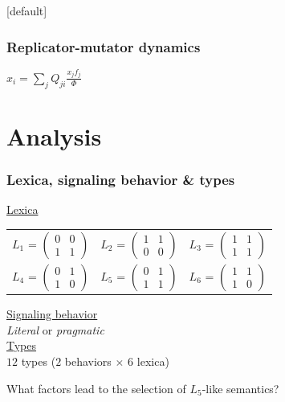 \documentclass{beamer} %
\makeatletter
\newenvironment{withoutheadline}{
        \setbeamertemplate{headline}[default]
        \def\beamer@entrycode{\vspace*{-\headheight}}
    }{}
\makeatother
\begin{document}
\begin{withoutheadline}
\begin{frame}
	\frametitle{Replicator-mutator dynamics}
\begin{center}
$\hat{x}_i = \sum_j Q_{ji} \frac{x_j f_j}{\Phi}$
\end{center}
\end{frame}


\section{Analysis}



\begin{frame}
	\frametitle{Lexica, signaling behavior \& types}
\underline{Lexica}
\begin{table}
\centering 
\begin{tabular}{l c l}
$L_1$ = $\begin{pmatrix} 0 & 0 \\ 1 & 1 \end{pmatrix}$ & 
$L_2$ = $\begin{pmatrix} 1 & 1 \\ 0 & 0 \end{pmatrix}$ & 
$L_3$ = $\begin{pmatrix} 1 & 1 \\ 1 & 1 \end{pmatrix}$\\[1cm]

$L_4$ = $\begin{pmatrix} 0 & 1 \\ 1 & 0 \end{pmatrix}$ &
$L_5$ = $\begin{pmatrix} 0 & 1 \\ 1 & 1 \end{pmatrix}$ &
$L_6$ = $\begin{pmatrix} 1 & 1 \\ 1 & 0 \end{pmatrix}$
\end{tabular}
\end{table}
\underline{Signaling behavior}\\ {\em Literal} or {\em pragmatic}\\[0.75cm]
\underline{Types}\\ $12$ types ($2$ behaviors $\times$ $6$ lexica)
\end{frame}

\begin{frame} 
\begin{center}What factors lead to the selection of $L_5$-like semantics?\end{center}
\end{frame}


\end{withoutheadline}
\end{document}
